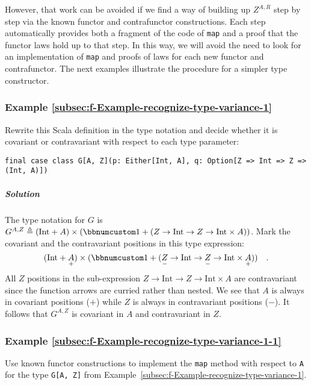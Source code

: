 However, that work can be avoided if we find a way of building up
$Z^{A,R}$ step by step via the known functor and contrafunctor constructions.
Each step automatically provides both a fragment of the code of \lstinline!map!
and a proof that the functor laws hold up to that step. In this way,
we will avoid the need to look for an implementation of \lstinline!map!
and proofs of laws for each new functor and contrafunctor. The next
examples illustrate the procedure for a simpler type constructor.

\subsubsection{Example \label{subsec:f-Example-recognize-type-variance-1}\ref{subsec:f-Example-recognize-type-variance-1}}

Rewrite this Scala definition in the type notation and decide whether
it is covariant or contravariant with respect to each type parameter:

\begin{lstlisting}
final case class G[A, Z](p: Either[Int, A], q: Option[Z => Int => Z => (Int, A)])
\end{lstlisting}


\subparagraph{Solution}

The type notation for $G$ is $G^{A,Z}\triangleq(\text{Int}+A)\times(\bbnum 1+(Z\rightarrow\text{Int}\rightarrow Z\rightarrow\text{Int}\times A))$.
Mark the covariant and the contravariant positions in this type expression:
\[
(\text{Int}+\underset{+}{A})\times(\bbnum 1+(\underset{-}{Z}\rightarrow\text{Int}\rightarrow\underset{-}{Z}\rightarrow\text{Int}\times\underset{+}{A}))\quad.
\]
All $Z$ positions in the sub-expression $Z\rightarrow\text{Int}\rightarrow Z\rightarrow\text{Int}\times A$
are contravariant since the function arrows are curried rather than
nested. We see that $A$ is always in covariant positions ($+$) while
$Z$ is always in contravariant positions ($-$). It follows that
$G^{A,Z}$ is covariant in $A$ and contravariant in $Z$. 

\subsubsection{Example \label{subsec:f-Example-recognize-type-variance-1-1}\ref{subsec:f-Example-recognize-type-variance-1-1}}

Use known functor constructions to implement the \lstinline!map!
method with respect to \lstinline!A! for the type \lstinline!G[A, Z]!
from Example~\ref{subsec:f-Example-recognize-type-variance-1}.

